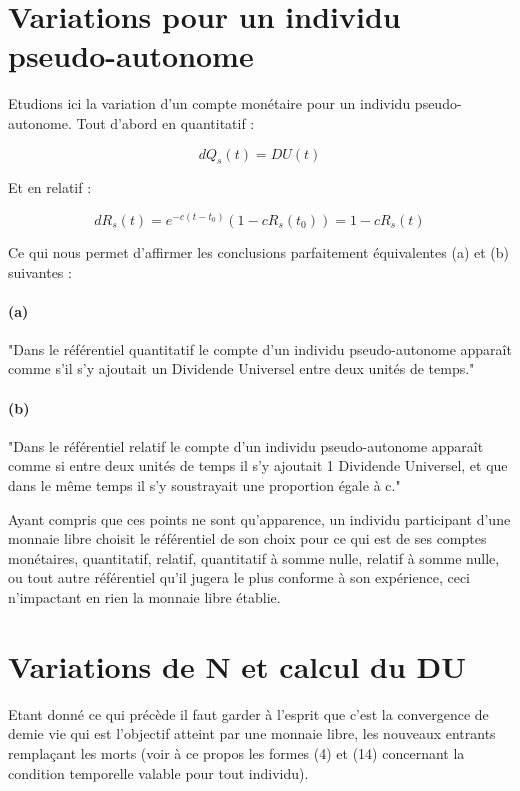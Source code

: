 \documentclass[a4paper,oneside,12pt]{article}
\begin{document}
\section{Variations pour un individu pseudo-autonome}

Etudions ici la variation d'un compte monétaire pour un individu pseudo-autonome. Tout d'abord en quantitatif :

\begin{displaymath}dQ_s(t)=DU(t) \end{displaymath}

Et en relatif :

\begin{displaymath}dR_s(t)=e^{-c(t-t_{0})} \left( 1-cR_s(t_{0}) \right) = 1-cR_s(t) \end{displaymath}

Ce qui nous permet d'affirmer les conclusions parfaitement équivalentes (a) et (b) suivantes :

\paragraph*{(a)}

"Dans le référentiel quantitatif le compte d'un individu pseudo-autonome apparaît comme s'il s'y ajoutait un Dividende Universel entre deux unités de temps."

\paragraph*{(b)}

"Dans le référentiel relatif le compte d'un individu pseudo-autonome apparaît comme si entre deux unités de temps il s'y ajoutait 1 Dividende Universel, et que dans le même temps il s'y soustrayait une proportion égale à c."

Ayant compris que ces points ne sont qu'apparence, un individu participant d'une monnaie libre choisit le référentiel de son choix pour ce qui est de ses comptes monétaires, quantitatif, relatif, quantitatif à somme nulle, relatif à somme nulle, ou tout autre référentiel qu'il jugera le plus conforme à son expérience, ceci n'impactant en rien la monnaie libre établie.

\section{Variations de N et calcul du DU}

Etant donné ce qui précède il faut garder à l'esprit que c'est la convergence de demie vie qui est l'objectif atteint par une monnaie libre, les nouveaux entrants remplaçant les morts (voir à ce propos les formes (4) et (14) concernant la condition temporelle valable pour tout individu).
\end{document}
